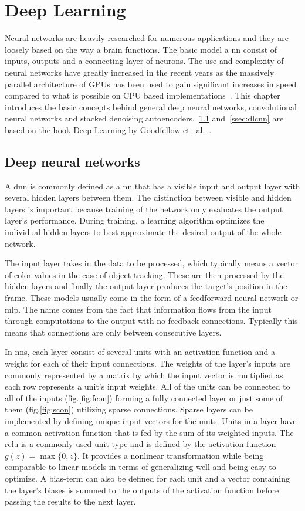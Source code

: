 \section{Deep Learning}
Neural networks are heavily researched for numerous applications and they are loosely
based on the way a brain functions. The basic model a \ac{nn} consist of inputs, outputs
and a connecting layer of neurons. The use and complexity of neural networks have greatly
increased in the recent years as the massively parallel architecture of GPUs has been
used to gain significant increases in speed compared to what is possible on CPU based
implementations~\cite{NIPS_IMAGENET}. This chapter introduces the basic concepts behind
general deep neural networks, convolutional neural networks and stacked denoising
autoencoders.~\ref{ssec:dldnn} and~\ref{ssec:dlcnn} are based on the book Deep Learning
by Goodfellow et.~al.~\cite{DEEP_LEARNING}.

\subsection{Deep neural networks}\label{ssec:dldnn}

A \ac{dnn} is commonly defined as a \ac{nn} that has a visible input and
output layer with several hidden layers between them. The distinction between
visible and hidden layers is important because training of the network only evaluates
the output layer's performance. During training, a learning algorithm optimizes
the individual hidden layers to best approximate the desired output of the whole network.

The input layer takes in the data to be processed, which typically means a vector of
color values in the case of object tracking. These are then processed by the hidden
layers and finally the output layer produces the target's position in the frame. These
models usually come in the form of a feedforward neural network or
\ac{mlp}. The name comes from the fact that information flows from the input
through computations to the output with no feedback connections. Typically
this means that connections are only between consecutive layers.

In \ac{nn}s, each layer consist of several units with an activation function
and a weight for each of their input connections. The weights of the layer's inputs
are commonly represented by a matrix by which the input vector is multiplied as each
row represents a unit's input weights. All of the units can be connected to all of the
inputs (fig.\ref{fig:fcon}) forming a fully connected layer or just some of them
(fig.\ref{fig:scon}) utilizing sparse connections. Sparse layers can be implemented
by defining unique input vectors for the units. Units in a layer have a common activation
function that is fed by the sum of its weighted inputs. The \ac{relu} is a
commonly used unit type and is defined by the activation function $g (z) = \max\{0,z\}$.
It provides a nonlinear transformation while being comparable to linear models in terms
of generalizing well and being easy to optimize. A bias-term can also be defined for
each unit and a vector containing the layer's biases is summed to the outputs of the
activation function before passing the results to the next layer.


